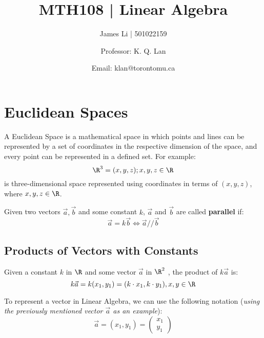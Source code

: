 \documentclass[a4paper]{article}
\title{MTH108 | Linear Algebra}
\author{James Li | 501022159 \and Professor: K. Q. Lan\and Email: klan@torontomu.ca}
\date{}
\begin{document}
  \maketitle
  \tableofcontents
  \newpage
  \section{Euclidean Spaces} 
  A Euclidean Space is a mathematical space in which points and lines can be represented by a set of coordinates in the respective dimension of the space, and every point can be represented in a defined set. For example:
  $$
  \R^3 = {(x,y,z); x,y,z \in \R}
  $$
  is three-dimensional space represented using coordinates in terms of $(x,y,z)$, where $x,y,z \in \R$.
  \begin{theorem}
    Given two vectors $\vec{a},\vec{b}$ and some constant $k$, $\vec{a}$ and $\vec{b}$ are called \textbf{parallel} if:
    \begin{displaymath}
      \vec{a} = k\vec{b} \Leftrightarrow \vec{a} // \vec{b}
    \end{displaymath}
    
  \end{theorem}
  
  \subsection{Products of Vectors with Constants}
  \begin{theorem}
    Given a constant $k$ in $\R$ and some vector $\vec{a}$ in $\R^2$ , the product of $k \vec{a}$ is:
    \begin{displaymath}
      k \vec{a} = k(x_1,y_1) = (k\cdot x_1, k\cdot y_1), x,y \in \R
    \end{displaymath}
  \end{theorem}
  To represent a vector in Linear Algebra, we can use the following notation (\textit{using the previously mentioned vector $\vec{a}$ as an example}):
  $$
  \vec{a} = (x_1,y_1) = 
  \begin{pmatrix}
   x_1 \\ y_1 
  \end{pmatrix}
  $$
\end{document}
